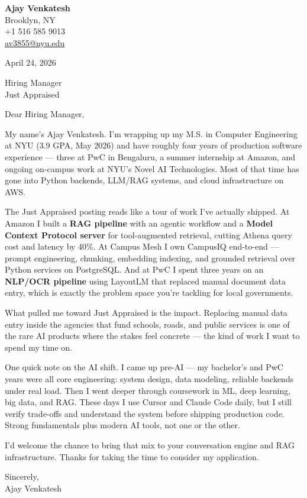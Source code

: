 \documentclass[letterpaper,11pt]{article}
\begin{document}
\begin{flushleft}
\textbf{\large Ajay Venkatesh} \\
Brooklyn, NY \\
+1 516 585 9013 \\
\href{mailto:av3855@nyu.edu}{av3855@nyu.edu}
\end{flushleft}

\vspace{10pt}

April 24, 2026

\vspace{6pt}

Hiring Manager \\
Just Appraised

\vspace{10pt}

Dear Hiring Manager,

My name's Ajay Venkatesh. I'm wrapping up my M.S. in Computer Engineering at NYU (3.9 GPA, May 2026) and have roughly four years of production software experience --- three at PwC in Bengaluru, a summer internship at Amazon, and ongoing on-campus work at NYU's Novel AI Technologies. Most of that time has gone into Python backends, LLM/RAG systems, and cloud infrastructure on AWS.

The Just Appraised posting reads like a tour of work I've actually shipped. At Amazon I built a \textbf{RAG pipeline} with an agentic workflow and a \textbf{Model Context Protocol server} for tool-augmented retrieval, cutting Athena query cost and latency by 40\%. At Campus Mesh I own CampusIQ end-to-end --- prompt engineering, chunking, embedding indexing, and grounded retrieval over Python services on PostgreSQL. And at PwC I spent three years on an \textbf{NLP/OCR pipeline} using LayoutLM that replaced manual document data entry, which is exactly the problem space you're tackling for local governments.

What pulled me toward Just Appraised is the impact. Replacing manual data entry inside the agencies that fund schools, roads, and public services is one of the rare AI products where the stakes feel concrete --- the kind of work I want to spend my time on.

One quick note on the AI shift. I came up pre-AI --- my bachelor's and PwC years were all core engineering: system design, data modeling, reliable backends under real load. Then I went deeper through coursework in ML, deep learning, big data, and RAG. These days I use Cursor and Claude Code daily, but I still verify trade-offs and understand the system before shipping production code. Strong fundamentals plus modern AI tools, not one or the other.

I'd welcome the chance to bring that mix to your conversation engine and RAG infrastructure. Thanks for taking the time to consider my application.

\vspace{12pt}

Sincerely, \\
Ajay Venkatesh
\end{document}
